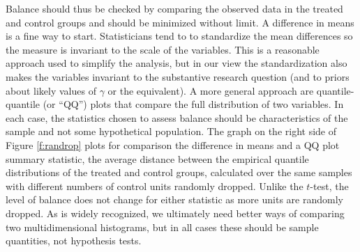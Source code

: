\documentclass[11pt,titlepage]{article}
\begin{document}
Balance should thus be checked by comparing the observed data in the
treated and control groups and should be minimized without limit.  A
difference in means is a fine way to start.  Statisticians tend to to
standardize the mean differences so the measure is invariant to the
scale of the variables.  This is a reasonable approach used to
simplify the analysis, but in our view the standardization also makes
the variables invariant to the substantive research question (and to
priors about likely values of $\gamma$ or the equivalent).  A more
general approach are quantile-quantile (or ``QQ'') plots that compare
the full distribution of two variables.  In each case, the statistics
chosen to assess balance should be characteristics of the sample and
not some hypothetical population.  The graph on the right side of
Figure \ref{f:randrop} plots for comparison the difference in means
and a QQ plot summary statistic, the average distance between the
empirical quantile distributions of the treated and control groups,
calculated over the same samples with different numbers of control
units randomly dropped.  Unlike the $t$-test, the level of balance
does not change for either statistic as more units are randomly
dropped.  As is widely recognized, we ultimately need better ways of
comparing two multidimensional histograms, but in all cases these
should be sample quantities, not hypothesis tests.




\end{document}
